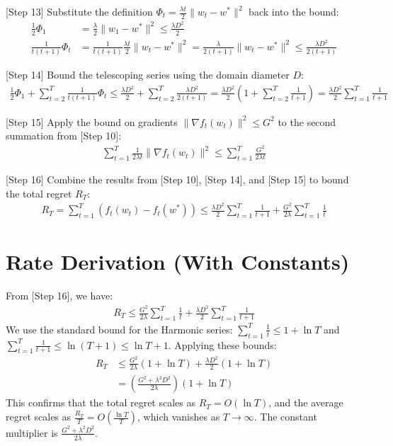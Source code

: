 \documentclass{article}
\begin{document}
[Step 13] Substitute the definition $\Phi_t = \frac{\lambda t}{2} \|w_t - w^*\|^2$ back into the bound:
\begin{align*}
\frac{1}{2}\Phi_1 &= \frac{\lambda}{2} \|w_1 - w^*\|^2 \leq \frac{\lambda D^2}{2} \\
\frac{1}{t(t+1)} \Phi_t &= \frac{1}{t(t+1)} \frac{\lambda t}{2} \|w_t - w^*\|^2 = \frac{\lambda}{2(t+1)} \|w_t - w^*\|^2 \leq \frac{\lambda D^2}{2(t+1)}
\end{align*}

[Step 14] Bound the telescoping series using the domain diameter $D$:
\begin{align*}
\frac{1}{2}\Phi_1 + \sum_{t=2}^T \frac{1}{t(t+1)} \Phi_t \leq \frac{\lambda D^2}{2} + \sum_{t=2}^T \frac{\lambda D^2}{2(t+1)} = \frac{\lambda D^2}{2} \left( 1 + \sum_{t=2}^T \frac{1}{t+1} \right) = \frac{\lambda D^2}{2} \sum_{t=1}^T \frac{1}{t+1}
\end{align*}

[Step 15] Apply the bound on gradients $\|\nabla f_t(w_t)\|^2 \leq G^2$ to the second summation from [Step 10]:
\begin{align*}
\sum_{t=1}^T \frac{1}{2\lambda t} \|\nabla f_t(w_t)\|^2 \leq \sum_{t=1}^T \frac{G^2}{2\lambda t}
\end{align*}

[Step 16] Combine the results from [Step 10], [Step 14], and [Step 15] to bound the total regret $R_T$:
\begin{align*}
R_T = \sum_{t=1}^T \left( f_t(w_t) - f_t(w^*) \right) \leq \frac{\lambda D^2}{2} \sum_{t=1}^T \frac{1}{t+1} + \frac{G^2}{2\lambda} \sum_{t=1}^T \frac{1}{t}
\end{align*}

\section*{Rate Derivation (With Constants)}
From [Step 16], we have:
\begin{align*}
R_T \leq \frac{G^2}{2\lambda} \sum_{t=1}^T \frac{1}{t} + \frac{\lambda D^2}{2} \sum_{t=1}^T \frac{1}{t+1}
\end{align*}
We use the standard bound for the Harmonic series: $\sum_{t=1}^T \frac{1}{t} \leq 1 + \ln T$ and $\sum_{t=1}^T \frac{1}{t+1} \leq \ln(T+1) \leq \ln T + 1$. Applying these bounds:
\begin{align*}
R_T &\leq \frac{G^2}{2\lambda} (1 + \ln T) + \frac{\lambda D^2}{2} (1 + \ln T) \\
&= \left( \frac{G^2 + \lambda^2 D^2}{2\lambda} \right) (1 + \ln T)
\end{align*}
This confirms that the total regret scales as $R_T = O(\ln T)$, and the average regret scales as $\frac{R_T}{T} = O\left(\frac{\ln T}{T}\right)$, which vanishes as $T \to \infty$. The constant multiplier is $\frac{G^2 + \lambda^2 D^2}{2\lambda}$.
\end{document}
